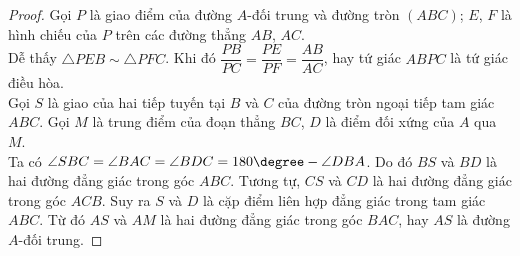     \begin{proof}
        Gọi \(P\) là giao điểm của đường \(A\)-đối trung và đường tròn \((ABC)\); \(E\), \(F\) là hình chiếu của \(P\) trên các đường thẳng \(AB\), \(AC\).\\
        Dễ thấy \(\triangle PEB \sim \triangle PFC\). Khi đó \(\dfrac{PB}{PC} = \dfrac{PE}{PF} = \dfrac{AB}{AC}\), hay tứ giác \(ABPC\) là tứ giác điều hòa.\\
        Gọi \(S\) là giao của hai tiếp tuyến tại \(B\) và \(C\) của đường tròn ngoại tiếp tam giác \(ABC\). Gọi \(M\) là trung điểm của đoạn thẳng \(BC\), \(D\) là điểm đối xứng của \(A\) qua \(M\).\\
        Ta có \(\angle SBC = \angle BAC = \angle BDC = 180 \degree - \angle DBA\). Do đó \(BS\) và \(BD\) là hai đường đẳng giác trong góc \(ABC\). Tương tự, \(CS\) và \(CD\) là hai đường đẳng giác trong góc \(ACB\). Suy ra \(S\) và \(D\) là cặp điểm liên hợp đẳng giác trong tam giác \(ABC\). Từ đó \(AS\) và \(AM\) là hai đường đẳng giác trong góc \(BAC\), hay \(AS\) là đường \(A\)-đối trung.
    \end{proof}